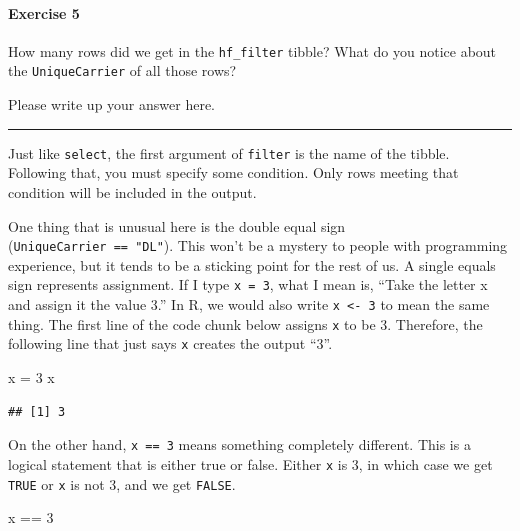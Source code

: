 \documentclass[
]{book}
\newenvironment{Shaded}{\begin{snugshade}}{\end{snugshade}}
\newcommand{\DecValTok}[1]{\textcolor[rgb]{0.00,0.00,0.81}{#1}}
\newcommand{\NormalTok}[1]{#1}
\newcommand{\OtherTok}[1]{\textcolor[rgb]{0.56,0.35,0.01}{#1}}
\newcommand{\SpecialCharTok}[1]{\textcolor[rgb]{0.00,0.00,0.00}{#1}}
\begin{document}
\hypertarget{exercise-5-2}{%
\paragraph*{Exercise 5}\label{exercise-5-2}}

How many rows did we get in the \texttt{hf\_filter} tibble? What do you notice about the \texttt{UniqueCarrier} of all those rows?

Please write up your answer here.

\begin{center}\rule{0.5\linewidth}{0.5pt}\end{center}

Just like \texttt{select}, the first argument of \texttt{filter} is the name of the tibble. Following that, you must specify some condition. Only rows meeting that condition will be included in the output.

One thing that is unusual here is the double equal sign (\texttt{UniqueCarrier\ ==\ "DL"}). This won't be a mystery to people with programming experience, but it tends to be a sticking point for the rest of us. A single equals sign represents assignment. If I type \texttt{x\ =\ 3}, what I mean is, ``Take the letter x and assign it the value 3.'' In R, we would also write \texttt{x\ \textless{}-\ 3} to mean the same thing. The first line of the code chunk below assigns \texttt{x} to be 3. Therefore, the following line that just says \texttt{x} creates the output ``3''.

\begin{Shaded}
\begin{Highlighting}[]
\NormalTok{x }\OtherTok{=} \DecValTok{3}
\NormalTok{x}
\end{Highlighting}
\end{Shaded}

\begin{verbatim}
## [1] 3
\end{verbatim}

On the other hand, \texttt{x\ ==\ 3} means something completely different. This is a logical statement that is either true or false. Either \texttt{x} is 3, in which case we get \texttt{TRUE} or \texttt{x} is not 3, and we get \texttt{FALSE}.

\begin{Shaded}
\begin{Highlighting}[]
\NormalTok{x }\SpecialCharTok{==} \DecValTok{3}
\end{Highlighting}
\end{Shaded}
\end{document}

